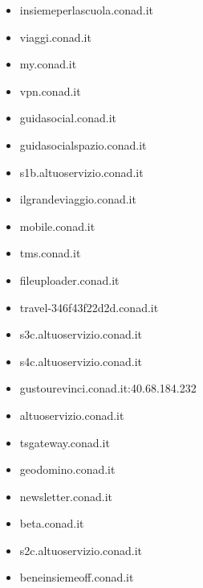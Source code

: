 \documentclass{article}
\begin{document}
\begin{itemize}
        \item insiemeperlascuola.conad.it
    
        \item viaggi.conad.it
    
        \item my.conad.it
    
        \item vpn.conad.it
    
        \item guidasocial.conad.it
    
        \item guidasocialspazio.conad.it
    
        \item s1b.altuoservizio.conad.it
    
        \item ilgrandeviaggio.conad.it
    
        \item mobile.conad.it
    
        \item tms.conad.it
    
        \item fileuploader.conad.it
    
        \item travel-346f43f22d2d.conad.it
    
        \item s3c.altuoservizio.conad.it
    
        \item s4c.altuoservizio.conad.it
    
        \item gustourevinci.conad.it:40.68.184.232
    
        \item altuoservizio.conad.it
    
        \item tsgateway.conad.it
    
        \item geodomino.conad.it
    
        \item newsletter.conad.it
    
        \item beta.conad.it
    
        \item s2c.altuoservizio.conad.it
    
        \item beneinsiemeoff.conad.it
    

\end{itemize}
\end{document}
